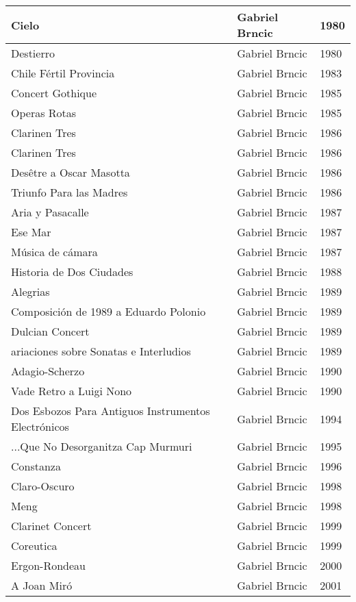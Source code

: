 \begin{center}
\begin{longtable}{ p{}  p{}  p{} }
Cielo & Gabriel Brncic & 1980 \\ \midrule 
Destierro & Gabriel Brncic & 1980 \\ \midrule 
Chile Fértil Provincia & Gabriel Brncic & 1983 \\ \midrule 
Concert Gothique & Gabriel Brncic & 1985 \\ \midrule 
Operas Rotas & Gabriel Brncic & 1985 \\ \midrule 
Clarinen Tres & Gabriel Brncic & 1986 \\ \midrule 
Clarinen Tres & Gabriel Brncic & 1986 \\ \midrule 
Desêtre a Oscar Masotta & Gabriel Brncic & 1986 \\ \midrule 
Triunfo Para las Madres & Gabriel Brncic & 1986 \\ \midrule 
Aria y Pasacalle & Gabriel Brncic & 1987 \\ \midrule 
Ese Mar & Gabriel Brncic & 1987 \\ \midrule 
Música de cámara & Gabriel Brncic & 1987 \\ \midrule 
Historia de Dos Ciudades & Gabriel Brncic & 1988 \\ \midrule 
Alegrias & Gabriel Brncic & 1989 \\ \midrule 
Composición de 1989 a Eduardo Polonio & Gabriel Brncic & 1989 \\ \midrule 
Dulcian Concert & Gabriel Brncic & 1989 \\ \midrule 
ariaciones sobre Sonatas e Interludios & Gabriel Brncic & 1989 \\ \midrule 
Adagio-Scherzo & Gabriel Brncic & 1990 \\ \midrule 
Vade Retro a Luigi Nono & Gabriel Brncic & 1990 \\ \midrule 
Dos Esbozos Para Antiguos Instrumentos Electrónicos & Gabriel Brncic & 1994 \\ \midrule 
...Que No Desorganitza Cap Murmuri & Gabriel Brncic & 1995 \\ \midrule 
Constanza & Gabriel Brncic & 1996 \\ \midrule 
Claro-Oscuro & Gabriel Brncic & 1998 \\ \midrule 
Meng & Gabriel Brncic & 1998 \\ \midrule 
Clarinet Concert & Gabriel Brncic & 1999 \\ \midrule 
Coreutica & Gabriel Brncic & 1999 \\ \midrule 
Ergon-Rondeau & Gabriel Brncic & 2000 \\ \midrule 
A Joan Miró & Gabriel Brncic & 2001 \\ \midrule 

\end{longtable}
\end{center}
